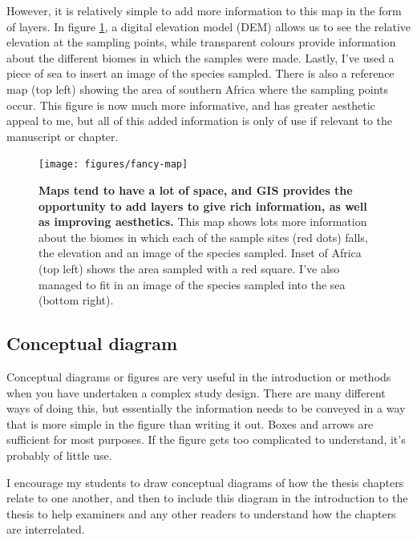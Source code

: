 \documentclass[
]{krantz}
\begin{document}
However, it is relatively simple to add more information to this map in the form of layers. In figure \ref{fig:fancy-map}, a digital elevation model (DEM) allows us to see the relative elevation at the sampling points, while transparent colours provide information about the different biomes in which the samples were made. Lastly, I've used a piece of sea to insert an image of the species sampled. There is also a reference map (top left) showing the area of southern Africa where the sampling points occur. This figure is now much more informative, and has greater aesthetic appeal to me, but all of this added information is only of use if relevant to the manuscript or chapter.



\begin{figure}

{\centering \texttt{[image: figures/fancy-map]} 

}

\caption{\textbf{Maps tend to have a lot of space, and GIS provides the opportunity to add layers to give rich information, as well as improving aesthetics.} This map shows lots more information about the biomes in which each of the sample sites (red dots) falls, the elevation and an image of the species sampled. Inset of Africa (top left) shows the area sampled with a red square. I've also managed to fit in an image of the species sampled into the sea (bottom right).}\label{fig:fancy-map}
\end{figure}

\hypertarget{conceptual-diagram}{%
\subsection{Conceptual diagram}\label{conceptual-diagram}}

Conceptual diagrams or figures are very useful in the introduction or methods when you have undertaken a complex study design. There are many different ways of doing this, but essentially the information needs to be conveyed in a way that is more simple in the figure than writing it out. Boxes and arrows are sufficient for most purposes. If the figure gets too complicated to understand, it's probably of little use.

I encourage my students to draw conceptual diagrams of how the thesis chapters relate to one another, and then to include this diagram in the introduction to the thesis to help examiners and any other readers to understand how the chapters are interrelated.
\end{document}
